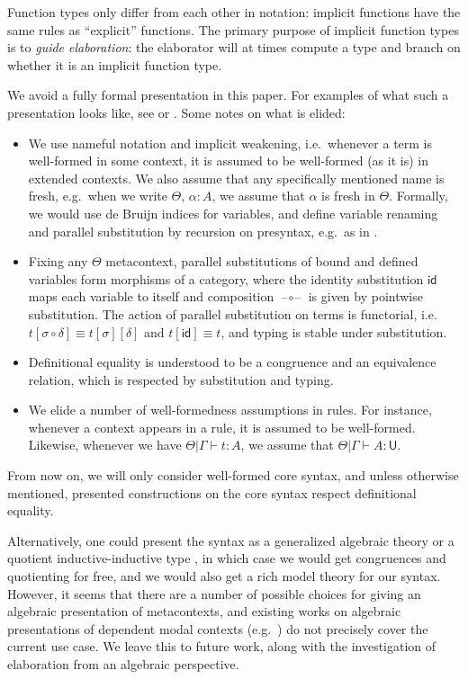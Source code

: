 \documentclass[acmsmall,screen,dvipsnames]{acmart}\settopmatter{}
\renewcommand{\U}{\mathsf{U}}
\newcommand{\id}{\mathsf{id}}
\newcommand{\blank}{\mathord{\hspace{1pt}\text{--}\hspace{1pt}}}
\theoremstyle{remark}
\begin{document}
Function types only differ from each other in notation: implicit
functions have the same rules as ``explicit'' functions. The primary purpose of
implicit function types is to \emph{guide elaboration}: the elaborator will at
times compute a type and branch on whether it is an implicit function type.

We avoid a fully formal presentation in this paper. For examples of what such a
presentation looks like, see \cite{decidableconv} or \cite{coqnbe}. Some notes
on what is elided:
\begin{itemize}
  \item We use nameful notation and implicit weakening, i.e.\ whenever a term is
    well-formed in some context, it is assumed to be well-formed (as it is) in
    extended contexts. We also assume that any specifically mentioned name is
    fresh, e.g.\ when we write $\Theta,\,\alpha : A$, we assume that $\alpha$ is
    fresh in $\Theta$.  Formally, we would use de Bruijn indices for variables,
    and define variable renaming and parallel substitution by recursion on
    presyntax, e.g.\ as in \cite{autosubst}.
  \item Fixing any $\Theta$ metacontext, parallel substitutions of bound and
    defined variables form morphisms of a category, where the identity
    substitution $\id$ maps each variable to itself and composition
    $\blank\circ\blank$ is given by pointwise substitution. The action of
    parallel substitution on terms is functorial, i.e.\ $t[\sigma\circ\delta]
    \equiv t[\sigma][\delta]$ and $t[\id] \equiv t$, and typing is stable under
    substitution.
  \item
    Definitional equality is understood to be a congruence and an equivalence relation,
    which is respected by substitution and typing.
  \item
    We elide a number of well-formedness assumptions in rules. For instance, whenever
    a context appears in a rule, it is assumed to be well-formed. Likewise, whenever
    we have $\Theta|\Gamma\vdash t : A$, we assume that $\Theta|\Gamma\vdash A : \U$.
\end{itemize}

From now on, we will only consider well-formed core syntax, and unless otherwise
mentioned, presented constructions on the core syntax respect definitional
equality.

Alternatively, one could present the syntax as a generalized algebraic theory
\cite{sterling2019algebraic} or a quotient inductive-inductive type
\cite{ttintt}, in which case we would get congruences and quotienting for free,
and we would also get a rich model theory for our syntax. However, it seems that
there are a number of possible choices for giving an algebraic presentation of
metacontexts, and existing works on algebraic presentations of dependent modal
contexts (e.g.\ \cite{dependentrightadjoints}) do not precisely cover the current use
case. We leave this to future work, along with the investigation of elaboration
from an algebraic perspective.
\end{document}
